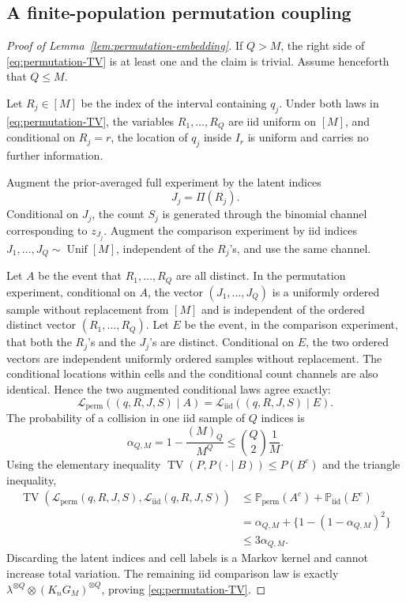 \documentclass[11pt]{article}
\newcommand\pr{\mathbb P}
\newcommand{\TV}{\operatorname{TV}}
\begin{document}
\subsection{A finite-population permutation coupling}

\begin{proof}[Proof of Lemma~\ref{lem:permutation-embedding}]
If $Q>M$, the right side of \eqref{eq:permutation-TV} is at least one and the claim is trivial.  Assume henceforth that $Q\le M$.

Let $R_j\in[M]$ be the index of the interval containing $q_j$.  Under both laws in \eqref{eq:permutation-TV}, the variables $R_1,\dots,R_Q$ are iid uniform on $[M]$, and conditional on $R_j=r$, the location of $q_j$ inside $I_r$ is uniform and carries no further information.

Augment the prior-averaged full experiment by the latent indices
\[
J_j=\Pi(R_j).
\]
Conditional on $J_j$, the count $S_j$ is generated through the binomial channel corresponding to $z_{J_j}$.  Augment the comparison experiment by iid indices $J_1,\dots,J_Q\sim\operatorname{Unif}[M]$, independent of the $R_j$'s, and use the same channel.

Let $A$ be the event that $R_1,\dots,R_Q$ are all distinct.  In the permutation experiment, conditional on $A$, the vector $(J_1,\dots,J_Q)$ is a uniformly ordered sample without replacement from $[M]$ and is independent of the ordered distinct vector $(R_1,\dots,R_Q)$.  Let $E$ be the event, in the comparison experiment, that both the $R_j$'s and the $J_j$'s are distinct.  Conditional on $E$, the two ordered vectors are independent uniformly ordered samples without replacement.  The conditional locations within cells and the conditional count channels are also identical.  Hence the two augmented conditional laws agree exactly:
\[
\mathcal L_{\mathrm{perm}}((q,R,J,S)\mid A)
=
\mathcal L_{\mathrm{iid}}((q,R,J,S)\mid E).
\]
The probability of a collision in one iid sample of $Q$ indices is
\[
\alpha_{Q,M}
=
1-\frac{(M)_Q}{M^Q}
\le
\binom Q2\frac1M.
\]
Using the elementary inequality $\TV(P,P(\cdot\mid B))\le P(B^c)$ and the triangle inequality,
\begin{align*}
\TV(\mathcal L_{\mathrm{perm}}(q,R,J,S),
     \mathcal L_{\mathrm{iid}}(q,R,J,S))
&\le
\pr_{\mathrm{perm}}(A^c)
+
\pr_{\mathrm{iid}}(E^c)\\
&=
\alpha_{Q,M}
+
\{1-(1-\alpha_{Q,M})^2\}\\
&\le3\alpha_{Q,M}.
\end{align*}
Discarding the latent indices and cell labels is a Markov kernel and cannot increase total variation.  The remaining iid comparison law is exactly $\lambda^{\otimes Q}\otimes(K_nG_M)^{\otimes Q}$, proving \eqref{eq:permutation-TV}.
\end{proof}
\end{document}
